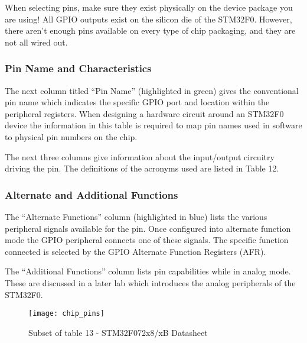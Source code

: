 \documentclass[openany,11pt,fleqn]{book} %
\begin{document}
    \begin{warning}
        When selecting pins, make sure they exist physically on the device package you are using! All GPIO outputs exist on the silicon die of the STM32F0. However, there aren't enough pins available on every type of chip packaging, and they are not all wired out.
    \end{warning}

    \subsubsection{Pin Name and Characteristics}
    The next column titled ``Pin Name'' (highlighted in green) gives the conventional pin name which indicates the specific GPIO port and location within the peripheral registers. When designing a hardware circuit around an STM32F0 device the information in this table is required to map pin names used in software to physical pin numbers on the chip. 
   
   The next three columns give information about the input/output circuitry driving the pin. The definitions of the acronyms used are listed in Table 12. 
    
    \subsubsection{Alternate and Additional Functions}
    The ``Alternate Functions'' column (highlighted in blue) lists the various peripheral signals available for the pin. Once configured into alternate function mode the GPIO peripheral connects one of these signals. The specific function connected is selected by the GPIO Alternate Function Registers (AFR).
    
    The ``Additional Functions'' column lists pin capabilities while in analog mode. These are discussed in a later lab which introduces the analog peripherals of the STM32F0.


%    
    \begin{figure}[]
        \centering\texttt{[image: chip\_pins]}
        \caption{Subset of table 13 - STM32F072x8/xB Datasheet}
        \label{chip_pins}
    \end{figure}
\end{document}

